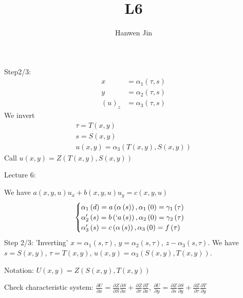 \documentclass[a4paper]{article}
\title{L6}
\author{Hanwen Jin}
\theoremstyle{definition}
\begin{document}
	\maketitle
	Step2/3:
	\begin{align*}
		x&=\alpha_1\left( \tau,s \right) \\
		y&=\alpha_2\left( \tau,s \right) \\
		\left( u \right) _{z}&=\alpha_3\left( \tau,s \right) 
	\end{align*} 
	We invert
	\begin{align*}
		\tau=T\left( x,y \right) \\
		s=S\left( x,y \right) \\
		u\left( x,y \right) =\alpha_3\left( T\left( x,y \right) ,S\left( x,y \right)  \right) 
	\end{align*} 
	Call $u\left( x,y \right) =Z\left( T\left( x,y \right) ,S\left( x,y \right)  \right) $

	Lecture 6:

	We have $a\left( x,y,u \right) u_{x}+b\left( x,y,u \right) u_{y}=c\left( x,y,u \right) $
	\begin{equation}
		\begin{cases}
			\alpha_1\left( d \right) =a\left( \alpha\left( s \right)  \right) , \alpha_1\left( 0 \right) =\gamma_1\left( \tau \right) \\
			\alpha_2'\left( s \right) =b\left( `a\left( s \right)  \right) , \alpha_2\left( 0 \right) =\gamma_2\left( \tau \right) \\
			\alpha_3'\left( s \right) =c\left( \alpha\left( s \right)  \right) , \alpha_3\left( 0 \right) =f\left( \tau \right) 
		\end{cases}
	\end{equation} 
	Step 2/3: 'Inverting' $x=\alpha_1\left( s,\tau \right) $, $y=\alpha_2\left( s,\tau \right) $, $z-\alpha_3\left( s,\tau \right) $. We have $s=S\left( x,y \right) $, $\tau=T\left( x,y \right) $, $u\left( x,y \right) =\alpha_3\left( S\left( x,y \right) ,T\left( x,y \right)  \right) $. 

	Notation: $U\left( x,y \right) =Z\left( S\left( x,y \right) ,T\left( x,y \right)  \right) $

	Check characteristic system: 
	$\frac{\partial U}{\partial x} =\frac{\partial Z}{\partial S} \frac{\partial S}{\partial x} +\frac{\partial Z}{\partial \tau} \frac{\partial T}{\partial x} $, $\frac{\partial U}{\partial y} =\frac{\partial Z}{\partial s} \frac{\partial S}{\partial y} +\frac{\partial Z}{\partial \tau} \frac{\partial T}{\partial y} $
\end{document}

